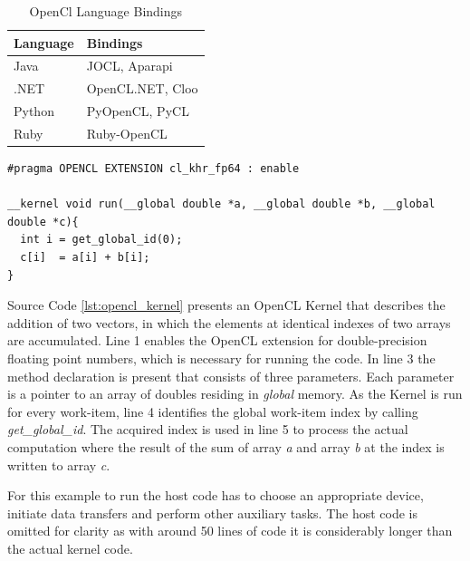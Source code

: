 \begin{table}[htb]
	\centering
	\begin{adjustbox}{width=0.3\textwidth}
		\small
		\begin{tabular}{l | l}
			\textbf{Language}	& \textbf{Bindings}   \\
			\hline
			Java        &  JOCL, Aparapi\\
			.NET        &  OpenCL.NET, Cloo\\
			Python      &  PyOpenCL, PyCL\\
			Ruby	    &  Ruby-OpenCL\\


		\end{tabular}
	\end{adjustbox}
	
	\caption{OpenCl Language Bindings}
	\label{table:opencl_language_bindings}
\end{table}

\begin{minipage}{\linewidth}

\begin{lstlisting}[caption=OpenCL Vector Addition Kernel,captionpos=b,label={lst:opencl_kernel}]
#pragma OPENCL EXTENSION cl_khr_fp64 : enable

__kernel void run(__global double *a, __global double *b, __global double *c){
  int i = get_global_id(0);
  c[i]  = a[i] + b[i];
}
\end{lstlisting}
\end{minipage}
Source Code \ref{lst:opencl_kernel} presents an OpenCL Kernel that describes the addition of two vectors, in which the elements at identical indexes of two arrays are accumulated. Line 1 enables the OpenCL extension for double-precision floating point numbers, which is necessary for running the code. In line 3 the method declaration is present that consists of three parameters. Each parameter is a pointer to an array of doubles residing in \textit{global} memory. As the Kernel is run for every work-item, line 4 identifies the global work-item index by calling \textit{get\_global\_id}. The acquired index is used in line 5 to process the actual computation where the result of the sum of array \textit{a} and array \textit{b} at the index is written to array \textit{c}.

For this example to run the host code has to choose an appropriate device, initiate data transfers and perform other auxiliary tasks. The host code is omitted for clarity as with around 50 lines of code it is considerably longer than the actual kernel code. 


